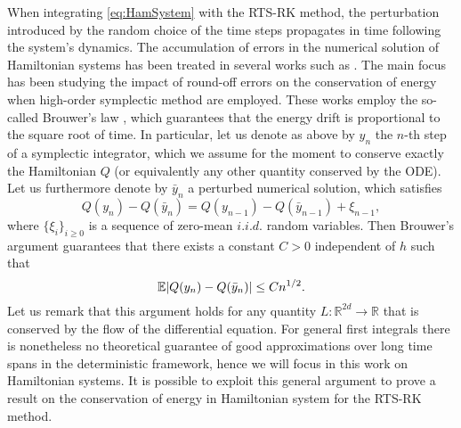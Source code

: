 \documentclass{siamart1116}
\numberwithin{theorem}{section}
\DeclarePairedDelimiter{\abs}{\lvert}{\rvert}
\newcommand{\R}{\mathbb{R}}
\newcommand{\E}{\operatorname{\mathbb{E}}}
\newcommand{\corr}[1]{{\color{red}#1}}
\begin{document}
When integrating \eqref{eq:HamSystem} with the RTS-RK method, the perturbation introduced by the random choice of the time steps propagates in time following the system's dynamics. The accumulation of errors in the numerical solution of Hamiltonian systems has been treated in several works such as \cite{HMR08, Vil08b}. The main focus has been studying the impact of round-off errors on the conservation of energy when high-order symplectic method are employed. These works employ the so-called Brouwer's law \cite{Bro37}, which guarantees that the energy drift is proportional to the square root of time. In particular, let us denote as above by $y_n$ the $n$-th step of a symplectic integrator, which we assume for the moment to conserve exactly the Hamiltonian $Q$ (or equivalently any other quantity conserved by the ODE). Let us furthermore denote by $\bar y_n$ a perturbed numerical solution, which satisfies
\begin{equation}
	Q(y_n) - Q(\bar y_n) = Q(y_{n-1}) - Q(\bar y_{n-1}) + \xi_{n-1},
\end{equation}
where $\{\xi_i\}_{i\geq 0}$ is a sequence of \corr{zero-mean $i.i.d.$} random variables. Then Brouwer's argument \corr{\cite{Bro37, HMR08, Vil08b}} guarantees that there exists a constant $C > 0$ independent of $h$ such that
\begin{equation}
	\E\abs{Q(y_n) - Q(\bar y_n)} \leq C n^{1/2}.
\end{equation}
\corr{Let us remark that this argument holds for any quantity $L \colon \R^{2d} \to \R$ that is conserved by the flow of the differential equation. For general first integrals there is nonetheless no theoretical guarantee of good approximations over long time spans in the deterministic framework, hence we will focus in this work on Hamiltonian systems.}  
It is possible to exploit this general argument to prove a result on the conservation of energy in Hamiltonian system for the RTS-RK method.
\end{document}
